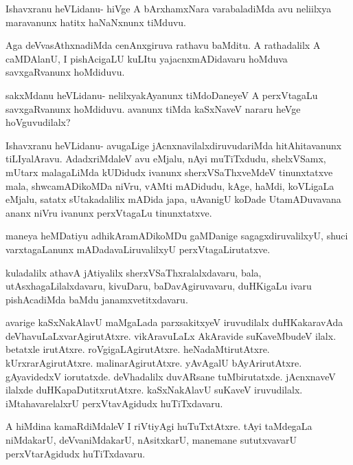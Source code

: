 \documentclass{article}
\begin{document}
\begin{mng}%
Ishavxranu heVLidanu- hiVge A bArxhamxNara varabaladiMda avu neliilxya 
maravanunx hatitx haNaNxnunx tiMduvu.
\end{mng}

\begin{mng}%
Aga deVvasAthxnadiMda cenAnxgiruva rathavu baMditu. A rathadalilx A 
caMDAlanU, I pishAcigaLU kuLItu yajacnxmADidavaru hoMduva 
savxgaRvanunx hoMdiduvu.
\end{mng}

\begin{mng}%
sakxMdanu heVLidanu- nelilxyakAyanunx tiMdoDaneyeV A perxVtagaLu 
savxgaRvanunx hoMdiduvu. avanunx tiMda kaSxNaveV nararu heVge 
hoVguvudilalx?
\end{mng}

\begin{mng}%
Ishavxranu heVLidanu- avugaLige jAcnxnavilalxdiruvudariMda 
hitAhitavanunx tiLIyalAravu. AdadxriMdaleV avu eMjalu, nAyi 
muTiTxdudu, shelxVSamx, mUtarx malagaLiMda kUDidudx ivanunx 
sherxVSaThxveMdeV tinunxtatxve mala, shwcamADikoMDa niVru, vAMti 
mADidudu, kAge, haMdi, koVLigaLa eMjalu, satatx sUtakadalilix mADida 
japa, uAvanigU koDade UtamADuvavana ananx niVru ivanunx perxVtagaLu 
tinunxtatxve.
\end{mng}

\begin{mng}%
maneya heMDatiyu adhikAramADikoMDu gaMDanige sagagxdiruvalilxyU, shuci 
varxtagaLanunx mADadavaLiruvalilxyU perxVtagaLirutatxve.
\end{mng}

\begin{mng}%
kuladalilx athavA jAtiyalilx sherxVSaThxralalxdavaru, bala, 
utAsxhagaLilalxdavaru, kivuDaru, baDavAgiruvavaru, duHKigaLu ivaru 
pishAcadiMda baMdu janamxvetitxdavaru.
\end{mng}

\begin{mng}%
avarige kaSxNakAlavU maMgaLada parxsakitxyeV iruvudilalx duHKakaravAda 
deVhavuLaLxvarAgirutAtxre. vikAravuLaLx AkAravide suKaveMbudeV ilalx. 
betatxle irutAtxre. roVgigaLAgirutAtxre. heNadaMtirutAtxre. 
kUrxrarAgirutAtxre. malinarAgirutAtxre. yAvAgalU bAyArirutAtxre. 
gAyavidedxV iorutatxde. deVhadalilx duvARsane tuMbirutatxde. 
jAcnxnaveV ilalxde duHKapaDutitxrutAtxre. kaSxNakAlavU suKaveV 
iruvudilalx. iMtahavarelalxrU perxVtavAgidudx huTiTxdavaru.
\end{mng}

\begin{mng}%
A hiMdina kamaRdiMdaleV I riVtiyAgi huTuTxtAtxre. tAyi taMdegaLa 
niMdakarU, deVvaniMdakarU, nAsitxkarU, manemane sututxvavarU 
perxVtarAgidudx huTiTxdavaru.
\end{mng}
\end{document}
